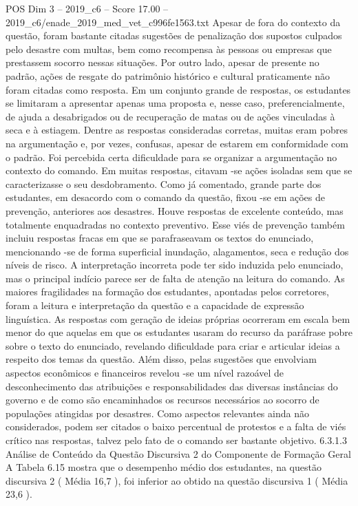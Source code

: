 \begin{textsample}{POS Dim 3 – 2019\_c6 – Score 17.00 – 2019\_c6/enade\_2019\_med\_vet\_c996fe1563.txt}
Apesar de fora do contexto da questão, foram bastante citadas sugestões de penalização dos supostos culpados pelo desastre com multas, bem como recompensa às pessoas ou empresas que prestassem socorro nessas situações.
Por outro lado, apesar de presente no padrão, ações de resgate do patrimônio histórico e cultural praticamente não foram citadas como resposta.
Em um conjunto grande de respostas, os estudantes se limitaram a apresentar apenas uma proposta e, nesse caso, preferencialmente, de ajuda a desabrigados ou de recuperação de matas ou de ações vinculadas à seca e à estiagem.
Dentre as respostas consideradas corretas, muitas eram pobres na argumentação e, por vezes, confusas, apesar de estarem em conformidade com o padrão.
Foi percebida certa dificuldade para se organizar a argumentação no contexto do comando.
Em muitas respostas, citavam -se ações isoladas sem que se caracterizasse o seu desdobramento.
Como já comentado, grande parte dos estudantes, em desacordo com o comando da questão, fixou -se em ações de prevenção, anteriores aos desastres.
Houve respostas de excelente conteúdo, mas totalmente enquadradas no contexto preventivo.
Esse viés de prevenção também incluiu respostas fracas em que se parafraseavam os textos do enunciado, mencionando -se de forma superficial inundação, alagamentos, seca e redução dos níveis de risco.
A interpretação incorreta pode ter sido induzida pelo enunciado, mas o principal indício parece ser de falta de atenção na leitura do comando.
As maiores fragilidades na formação dos estudantes, apontadas pelos corretores, foram a leitura e interpretação da questão e a capacidade de expressão linguística.
As respostas com geração de ideias próprias ocorreram em escala bem menor do que aquelas em que os estudantes usaram do recurso da paráfrase pobre sobre o texto do enunciado, revelando dificuldade para criar e articular ideias a respeito dos temas da questão.
Além disso, pelas sugestões que envolviam aspectos econômicos e financeiros revelou -se um nível razoável de desconhecimento das atribuições e responsabilidades das diversas instâncias do governo e de como são encaminhados os recursos necessários ao socorro de populações atingidas por desastres.
Como aspectos relevantes ainda não considerados, podem ser citados o baixo percentual de protestos e a falta de viés crítico nas respostas, talvez pelo fato de o comando ser bastante objetivo. 6.3.1.3 Análise de Conteúdo da Questão Discursiva 2 do Componente de Formação Geral A Tabela 6.15 mostra que o desempenho médio dos estudantes, na questão discursiva 2 ( Média 16,7 ), foi inferior ao obtido na questão discursiva 1 ( Média 23,6 ).

\end{textsample}

